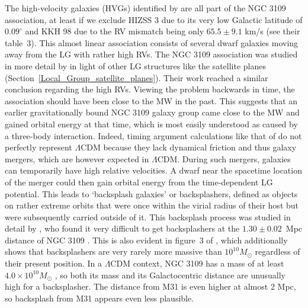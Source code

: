 \documentclass[fleqn,usenatbib,useAMS,onecolumn]{mnras} %
\begin{document}
The high-velocity galaxies (HVGs) identified by \citet{Banik_2018_anisotropy} are all part of the NGC 3109 association, at least if we exclude HIZSS 3 due to its very low Galactic latitude of $0.09^\circ$ and KKH 98 due to the RV mismatch being only $65.5 \pm 9.1$ km/s (see their table~3). This almost linear association \citep{Bellazzini_2013} consists of several dwarf galaxies moving away from the LG with rather high RVs. The NGC 3109 association was studied in more detail by \citet{Pawlowski_McGaugh_2014} in light of other LG structures like the satellite planes (Section~\ref{Local_Group_satellite_planes}). Their work reached a similar conclusion regarding the high RVs. Viewing the problem backwards in time, the association should have been close to the MW in the past. This suggests that an earlier gravitationally bound NGC 3109 galaxy group came close to the MW and gained orbital energy at that time, which is most easily understood as caused by a three-body interaction. Indeed, timing argument calculations like that of \citet{Banik_2018_anisotropy} do not perfectly represent $\Lambda$CDM because they lack dynamical friction and thus galaxy mergers, which are however expected in $\Lambda$CDM. During such mergers, galaxies can temporarily have high relative velocities. A dwarf near the spacetime location of the merger could then gain orbital energy from the time-dependent LG potential. This leads to `backsplash galaxies' or backsplashers, defined as objects on rather extreme orbits that were once within the virial radius of their host but were subsequently carried outside of it. This backsplash process was studied in detail by \citet{Sales_2007}, who found it very difficult to get backsplashers at the $1.30 \pm 0.02$~Mpc distance of NGC 3109 \citep{Soszynski_2006}. This is also evident in figure~3 of \citet{Teyssier_2012}, which additionally shows that backsplashers are very rarely more massive than $10^{10} M_\odot$ regardless of their present position. In a $\Lambda$CDM context, NGC 3109 has a mass of at least $4.0 \times 10^{10} M_\odot$ \citep{Li_2020}, so both its mass and its Galactocentric distance are unusually high for a backsplasher. The distance from M31 is even higher at almost 2 Mpc, so backsplash from M31 appears even less plausible.
\end{document}

